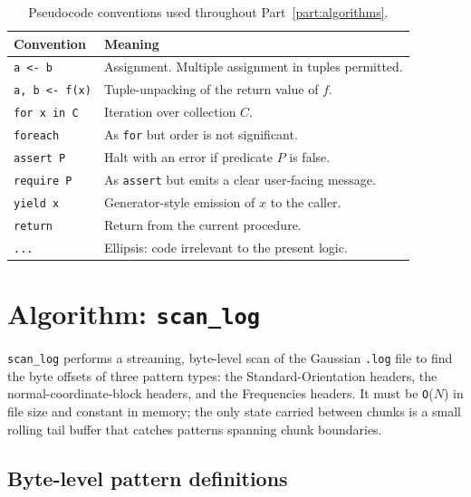 \documentclass[10pt,a4paper,twoside]{article}
\newcommand{\codref}[1]{%
  \quad\text{\textcolor{gray!70!black}{\footnotesize $\rightsquigarrow$~\texttt{#1}}}}
\newcommand{\fn}[1]{\texttt{#1}}
\newcommand{\file}[1]{\texttt{#1}}
\begin{document}
\begin{table}[h]
\centering
\begin{tabular}{p{} p{}}
\toprule
\textbf{Convention} & \textbf{Meaning} \\
\midrule
\texttt{a <- b}            & Assignment. Multiple assignment in tuples permitted. \\
\texttt{a, b <- f(x)}      & Tuple-unpacking of the return value of $f$. \\
\texttt{for x in C}        & Iteration over collection $C$. \\
\texttt{foreach}           & As \texttt{for} but order is not significant. \\
\texttt{assert P}          & Halt with an error if predicate $P$ is false. \\
\texttt{require P}         & As \texttt{assert} but emits a clear user-facing message. \\
\texttt{yield x}           & Generator-style emission of $x$ to the caller. \\
\texttt{return}            & Return from the current procedure. \\
\texttt{...}               & Ellipsis: code irrelevant to the present logic. \\
\bottomrule
\end{tabular}
\caption{Pseudocode conventions used throughout Part~\ref{part:algorithms}.}
\label{tab:pseudo-conv}
\end{table}

\section{Algorithm: \fn{scan\_log}}
\label{sec:algo-scan-log}

\codref{logio.scan\_log}

\fn{scan\_log} performs a streaming, byte-level scan of the Gaussian
\file{.log} file to find the byte offsets of three pattern types:
the Standard-Orientation headers, the normal-coordinate-block
headers, and the Frequencies headers. It must be \texttt{O}($N$)
in file size and constant in memory; the only state carried between
chunks is a small rolling tail buffer that catches patterns
spanning chunk boundaries.

\subsection{Byte-level pattern definitions}
\label{sec:scan-patterns}
\end{document}
